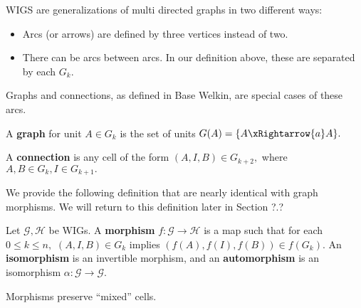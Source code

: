 WIGS are generalizations of multi directed graphs in two different ways:
\begin{itemize}
  \item Arcs (or arrows) are defined by three vertices instead of two.
  \item There can be arcs between arcs. In our definition above, these are separated by each $G_{k}.$
\end{itemize}
Graphs and connections, as defined in Base Welkin, are special cases of these arcs.
\begin{definition}
  \item A \textbf{graph} for unit $A \in G_{k}$ is the set of units $G(A) = \{ A \xRightarrow{a} A \}.$
  \item A \textbf{connection} is any cell of the form $(A, I, B) \in G_{k+2},$ where $A, B \in G_{k}, I \in G_{k+1}.$
\end{definition}

We provide the following definition that are nearly identical with graph morphisms. We will return to this definition later in Section ?.?
\begin{definition} Let $\mathcal{G}, \mathcal{H}$ be WIGs. A \textbf{morphism} $f: \mathcal{G} \to \mathcal{H}$ is a map such that for each $0 \leq k \leq n,$ $(A, I, B) \in G_{k}$ implies $(f(A), f(I), f(B)) \in f(G_{k}).$ An \textbf{isomorphism} is an invertible morphism, and an \textbf{automorphism} is an isomorphism $\alpha: \mathcal{G} \to \mathcal{G}.$
\end{definition}
\begin{lemma}
Morphisms preserve ``mixed'' cells.
\end{lemma}


